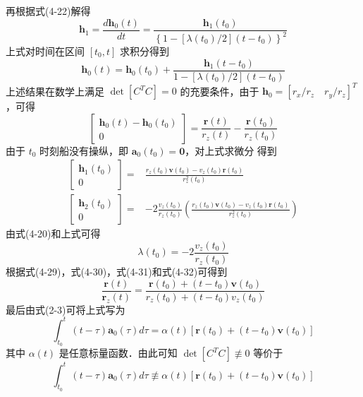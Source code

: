 再根据式(4-22)解得
\begin{equation}
	\bm{h}_1 = \frac{d \bm{h}_0 (t)}{d t} = \frac{\bm{h}_1 (t_0)}{\left\{1-[\lambda (t_0)/2](t-t_0)\right\} ^2}
\end{equation}
上式对时间在区间 $[t_0,t]$ 求积分得到
\begin{equation}
	\bm{h}_0(t) = \bm{h}_0 (t_0) +\frac{\bm{h}_1(t-t_0)}{1-[\lambda (t_0)/2](t-t_0)}
\end{equation}
上述结果在数学上满足 $\det[C^T C] =0$ 的充要条件，由于 $\bm{h}_0 = [r_x/r_z \quad r_y/r_z]^T$，可得
\begin{equation}
	\left[\begin{array}{c}
		\bm{h}_0 (t) - \bm{h}_0 (t_0) \\ \hline
		0
	\end{array}\right] = \frac{\bm{r}(t)}{r_z (t)} - \frac{\bm{r}(t_0)}{r_z (t_0)}
\end{equation}
由于 $t_0$ 时刻船没有操纵，即 $\bm{a}_0(t_0) = \bm{0}$，对上式求微分
得到
\begin{equation}
	\begin{split}
		\left[\begin{array}{c}
			\bm{h}_1 (t_0) \\ \hline
			0
		\end{array}\right] =& \frac{r_z(t_0)\bm{v}(t_0) - v_z(t_0)\bm{r}(t_0)}{r_z^2 (t_0)} \\
		\left[ \begin{array}{c}
			\bm{h}_2(t_0) \\ \hline
			0
		\end{array}\right] =& -2\frac{v_z(t_0)}{r_z(t_0)}\left( \frac{r_z(t_0) \bm{v}(t_0) - v_z(t_0)\bm{r}(t_0)}{r_z^2(t_0)}\right)
	\end{split} 
\end{equation}
由式(4-20)和上式可得
\begin{equation}
	\lambda (t_0) = -2 \frac{v_z(t_0)}{r_z (t_0)}
\end{equation}
根据式(4-29)，式(4-30)，式(4-31)和式(4-32)可得到
\begin{equation}
	\frac{\bm{r}(t)}{\bm{r}_z (t)} = \frac{\bm{r}(t_0) +(t-t_0)\bm{v}(t_0)}{r_z(t_0) + (t-t_0) v_z (t_0)}
\end{equation}
最后由式(2-3)可将上式写为
\begin{equation}
	\int_{t_0}^{t} (t-\tau) \bm{a}_0 (\tau)d \tau = \alpha(t) [\bm{r}(t_0) + (t-t_0) \bm{v}(t_0)]
\end{equation}
其中 $\alpha(t)$ 是任意标量函数．由此可知 $\det[C^T C] \not \equiv 0$ 等价于
\begin{equation}
	\int_{t_0}^{t} (t-\tau) \bm{a}_0 (\tau)d \tau \not \equiv \alpha(t) [\bm{r}(t_0) + (t-t_0) \bm{v}(t_0)]
\end{equation}